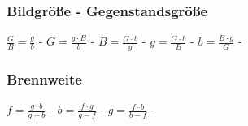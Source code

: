 \subsubsection{Bildgröße - Gegenstandsgröße} 
\begin{minipage}{0.45\textwidth} 
\end{minipage} 
\begin{minipage}{0.45\textwidth} 
 
\legende{}\end{minipage} 
 
$ \frac{G}{B} = \frac{g}{b} $ - $ G = \frac{g\cdot B}{ b} $ - $ B = \frac{G\cdot b}{ g} $ - $ g = \frac{G\cdot b}{ B} $ - $ b = \frac{B\cdot g}{ G} $ - \\ 
 
\subsubsection{Brennweite} 
\begin{minipage}{0.45\textwidth} 
\end{minipage} 
\begin{minipage}{0.45\textwidth} 
 
\legende{}\end{minipage} 
 
$ f  = \frac{g\cdot b}{g+b} $ - $ b  = \frac{f\cdot g}{g-f} $ - $ g  = \frac{f\cdot b}{b-f} $ - \\ 
 
